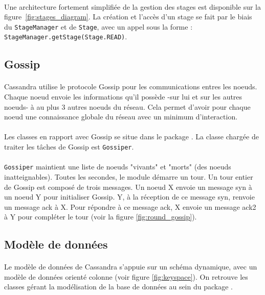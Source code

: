 \documentclass[12pt]{article}
\newcommand{\class}[1]{\texttt{#1}}
\begin{document}
\paragraph{} Une architecture fortement simplifiée de la gestion des stages est disponible sur la figure~\ref{fig:stages_diagram}. La création et l'accès d'un stage se fait par le biais du \class{StageManager} et de \class{Stage}, avec un appel sous la forme : \texttt{StageManager.getStage(Stage.READ)}.

\subsection{Gossip}

\paragraph{} Cassandra utilise le protocole Gossip pour les communications entres les noeuds. Chaque noeud envoie les informations qu'il possède -sur lui et sur les autres noeuds- à au plus 3 autres noeuds du réseau. Cela permet d'avoir pour chaque noeud une connaissance globale du réseau avec un minimum d'interaction.
\paragraph{} Les classes en rapport avec Gossip se situe dans le package . La classe chargée de traiter les tâches de Gossip est \class{Gossiper}.
\paragraph{} \class{Gossiper} maintient une liste de noeuds "vivants" et "morts" (des noeuds inatteignables). Toutes les secondes, le module démarre un tour. Un tour entier de Gossip est composé de trois messages. Un noeud X envoie un message syn à un noeud Y pour initialiser Gossip. Y, à la réception de ce message syn, renvoie un message ack à X. Pour répondre à ce message ack, X envoie un message ack2 à Y pour compléter le tour (voir la figure \ref{fig:round_gossip}).

\subsection{Modèle de données}

\paragraph{} Le modèle de données de Cassandra s'appuie sur un schéma dynamique, avec un modèle de données orienté colonne (voir figure \ref{fig:keyspace}). On retrouve les classes gérant la modélisation de la base de données au sein du package .
\end{document}
